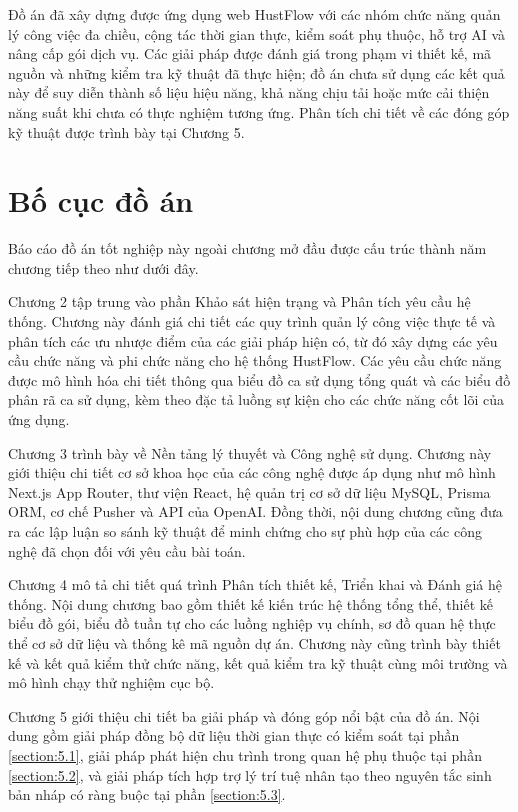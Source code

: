 \documentclass[../DoAn.tex]{subfiles}
\begin{document}
Đồ án đã xây dựng được ứng dụng web HustFlow với các nhóm chức năng quản lý công việc đa chiều, cộng tác thời gian thực, kiểm soát phụ thuộc, hỗ trợ AI và nâng cấp gói dịch vụ. Các giải pháp được đánh giá trong phạm vi thiết kế, mã nguồn và những kiểm tra kỹ thuật đã thực hiện; đồ án chưa sử dụng các kết quả này để suy diễn thành số liệu hiệu năng, khả năng chịu tải hoặc mức cải thiện năng suất khi chưa có thực nghiệm tương ứng. Phân tích chi tiết về các đóng góp kỹ thuật được trình bày tại Chương 5.

\section{Bố cục đồ án}
\label{section:1.4}

Báo cáo đồ án tốt nghiệp này ngoài chương mở đầu được cấu trúc thành năm chương tiếp theo như dưới đây.

Chương 2 tập trung vào phần Khảo sát hiện trạng và Phân tích yêu cầu hệ thống. Chương này đánh giá chi tiết các quy trình quản lý công việc thực tế và phân tích các ưu nhược điểm của các giải pháp hiện có, từ đó xây dựng các yêu cầu chức năng và phi chức năng cho hệ thống HustFlow. Các yêu cầu chức năng được mô hình hóa chi tiết thông qua biểu đồ ca sử dụng tổng quát và các biểu đồ phân rã ca sử dụng, kèm theo đặc tả luồng sự kiện cho các chức năng cốt lõi của ứng dụng.

Chương 3 trình bày về Nền tảng lý thuyết và Công nghệ sử dụng. Chương này giới thiệu chi tiết cơ sở khoa học của các công nghệ được áp dụng như mô hình Next.js App Router, thư viện React, hệ quản trị cơ sở dữ liệu MySQL, Prisma ORM, cơ chế Pusher và API của OpenAI. Đồng thời, nội dung chương cũng đưa ra các lập luận so sánh kỹ thuật để minh chứng cho sự phù hợp của các công nghệ đã chọn đối với yêu cầu bài toán.

Chương 4 mô tả chi tiết quá trình Phân tích thiết kế, Triển khai và Đánh giá hệ thống. Nội dung chương bao gồm thiết kế kiến trúc hệ thống tổng thể, thiết kế biểu đồ gói, biểu đồ tuần tự cho các luồng nghiệp vụ chính, sơ đồ quan hệ thực thể cơ sở dữ liệu và thống kê mã nguồn dự án. Chương này cũng trình bày thiết kế và kết quả kiểm thử chức năng, kết quả kiểm tra kỹ thuật cùng môi trường và mô hình chạy thử nghiệm cục bộ.

Chương 5 giới thiệu chi tiết ba giải pháp và đóng góp nổi bật của đồ án. Nội dung gồm giải pháp đồng bộ dữ liệu thời gian thực có kiểm soát tại phần \ref{section:5.1}, giải pháp phát hiện chu trình trong quan hệ phụ thuộc tại phần \ref{section:5.2}, và giải pháp tích hợp trợ lý trí tuệ nhân tạo theo nguyên tắc sinh bản nháp có ràng buộc tại phần \ref{section:5.3}.
\end{document}
